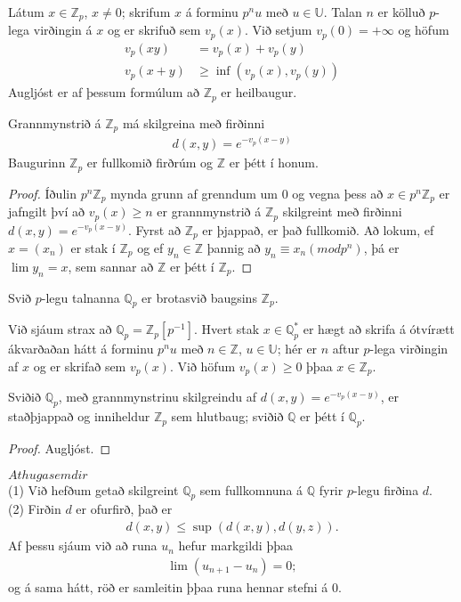 \begin{Rit}
Látum $x \in \mathbb{Z}_p$, $x \neq 0$; skrifum $x$ á forminu $p^nu$ með 
$u \in \mathbb{U}$. Talan $n$ er kölluð $p$-lega virðingin á $x$ og er skrifuð sem 
$v_p(x)$. Við setjum $v_p(0) = +\infty$ og höfum 
\begin{align*}
 v_p(xy) &= v_p(x) + v_p(y) \\
 v_p(x+y) &\geq \inf(v_p(x),v_p(y))
\end{align*}
Augljóst er af þessum formúlum að $\mathbb{Z}_p$ er heilbaugur.

\end{Rit}
\begin{setn}
 Grannmynstrið á $\mathbb{Z}_p$ má skilgreina með firðinni
\begin{align}
 d(x,y) = e^{-v_p(x-y)}
\end{align}
Baugurinn $\mathbb{Z}_p$ er fullkomið firðrúm og $\mathbb{Z}$  er þétt 
í honum.
\end{setn}
\begin{proof}
 Íðulin $p^n \mathbb{Z}_p$ mynda grunn af grenndum um 0 og vegna þess að 
$x \in p^n \mathbb{Z}_p$ er jafngilt því að $v_p(x) \geq n$ er grannmynstrið 
á $\mathbb{Z}_p$ skilgreint með firðinni $d(x,y) = e^{-v_p(x-y)}$. 
Fyrst að $\mathbb{Z}_p$ er þjappað, er það fullkomið. Að lokum, ef $x = (x_n)$
 er stak í $\mathbb{Z}_p$ og ef $y_n \in \mathbb{Z}$ þannig að 
$y_n \equiv x_n(mod p^n)$, þá er $\lim y_n = x$, sem sannar að $\mathbb{Z}$ 
er þétt í $\mathbb{Z}_p$.
\end{proof}

\begin{skilgr}
 Svið $p$-legu talnanna $\mathbb{Q}_p$ er brotasvið baugsins $\mathbb{Z}_p$.
\end{skilgr}
Við sjáum strax að $\mathbb{Q}_p = \mathbb{Z}_p[p^{-1}]$. Hvert stak 
$x \in \mathbb{Q}_p^*$ er hægt að skrifa á ótvírætt ákvarðaðan hátt á forminu 
$p^nu$ með $n \in \mathbb{Z}$, $u \in \mathbb{U}$; hér er $n$ aftur $p$-lega 
virðingin af $x$ og er skrifað sem $v_p(x)$. Við höfum $v_p(x) \geq 0$ þþaa 
$x \in \mathbb{Z}_p$. 
\begin{setn}
 Sviðið $\mathbb{Q}_p$, með grannmynstrinu skilgreindu af 
$d(x,y) = e^{-v_p(x-y)}$, er staðþjappað og inniheldur $\mathbb{Z}_p$ sem 
hlutbaug; sviðið $\mathbb{Q}$ er þétt í $\mathbb{Q}_p$.
\end{setn}
\begin{proof}
 Augljóst.
\end{proof}
$Athugasemdir$\\
(1) Við hefðum getað skilgreint $\mathbb{Q}_p$ sem fullkomnuna á $\mathbb{Q}$ 
fyrir $p$-legu firðina $d$.\\
(2) Firðin $d$ er ofurfirð, það er 
\begin{align*}
 d(x,y) \leq \sup (d(x,y),d(y,z)).
\end{align*}
Af þessu sjáum við að runa $u_n$ hefur markgildi þþaa 
\begin{align*}
 \lim(u_{n+1} - u_n) = 0;
\end{align*}
og á sama hátt, röð er samleitin þþaa runa hennar stefni á 0.

